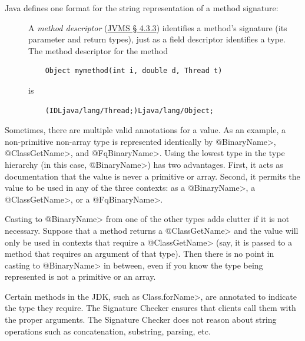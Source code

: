 Java defines one format for the string representation of a method signature:

\begin{description}

\item[]
  A \emph{method descriptor} (\href{https://docs.oracle.com/javase/specs/jvms/se17/html/jvms-4.html#jvms-4.3.3}{JVMS \S
    4.3.3}) identifies a method's signature (its parameter and return
  types), just as a field descriptor identifies a
  type.  The method descriptor for the method
\begin{Verbatim}
    Object mymethod(int i, double d, Thread t)
\end{Verbatim}
\noindent is
\begin{Verbatim}
    (IDLjava/lang/Thread;)Ljava/lang/Object;
\end{Verbatim}

\end{description}



Sometimes, there are multiple valid annotations for a value.  As an
example, a non-primitive non-array type is represented identically by
\<@BinaryName>, \<@ClassGetName>, and \<@FqBinaryName>.  Using the lowest
type in the type hierarchy (in this case, \<@BinaryName>) has two
advantages.  First, it acts as documentation that the value is never a
primitive or array.  Second, it permits the value to be used in any of the
three contexts:  as a \<@BinaryName>, a \<@ClassGetName>, or a
\<@FqBinaryName>.

Casting to \<@BinaryName> from one of the other types adds clutter if it is not
necessary.  Suppose that a method returns a \<@ClassGetName> and the value will
only be used in contexts that require a \<@ClassGetName> (say, it is passed to a
method that requires an argument of that type).  Then there is no point in
casting to \<@BinaryName> in between, even if you know the type being
represented is not a primitive or an array.



Certain methods in the JDK, such as \<Class.forName>, are annotated
to indicate the type they require.  The Signature Checker ensures that
clients call them with the proper arguments.  The Signature Checker does
not reason about string operations such as concatenation, substring,
parsing, etc.

